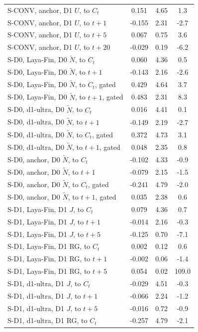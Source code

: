 \begin{longtable}{@{}lS[table-format=-1.3]S[table-format=1.2]S[table-format=-3.1]@{}}
S-CONV, anchor, D1 $U$, to $C_t$ & 0.151 & 4.65 & 1.3 \\
S-CONV, anchor, D1 $U$, to $t{+}1$ & -0.155 & 2.31 & -2.7 \\
S-CONV, anchor, D1 $U$, to $t{+}5$ & 0.067 & 0.75 & 3.6 \\
S-CONV, anchor, D1 $U$, to $t{+}20$ & -0.029 & 0.19 & -6.2 \\
S-D0, Laya-Fin, D0 $\tilde N$, to $C_t$ & 0.060 & 4.36 & 0.5 \\
S-D0, Laya-Fin, D0 $\tilde N$, to $t{+}1$ & -0.143 & 2.16 & -2.6 \\
S-D0, Laya-Fin, D0 $\tilde N$, to $C_t$, gated & 0.429 & 4.64 & 3.7 \\
S-D0, Laya-Fin, D0 $\tilde N$, to $t{+}1$, gated & 0.483 & 2.31 & 8.3 \\
S-D0, d1-ultra, D0 $\tilde N$, to $C_t$ & 0.016 & 4.41 & 0.1 \\
S-D0, d1-ultra, D0 $\tilde N$, to $t{+}1$ & -0.149 & 2.19 & -2.7 \\
S-D0, d1-ultra, D0 $\tilde N$, to $C_t$, gated & 0.372 & 4.73 & 3.1 \\
S-D0, d1-ultra, D0 $\tilde N$, to $t{+}1$, gated & 0.048 & 2.35 & 0.8 \\
S-D0, anchor, D0 $\tilde N$, to $C_t$ & -0.102 & 4.33 & -0.9 \\
S-D0, anchor, D0 $\tilde N$, to $t{+}1$ & -0.079 & 2.15 & -1.5 \\
S-D0, anchor, D0 $\tilde N$, to $C_t$, gated & -0.241 & 4.79 & -2.0 \\
S-D0, anchor, D0 $\tilde N$, to $t{+}1$, gated & 0.035 & 2.38 & 0.6 \\
S-D1, Laya-Fin, D1 $J$, to $C_t$ & 0.079 & 4.36 & 0.7 \\
S-D1, Laya-Fin, D1 $J$, to $t{+}1$ & -0.014 & 2.16 & -0.3 \\
S-D1, Laya-Fin, D1 $J$, to $t{+}5$ & -0.125 & 0.70 & -7.1 \\
S-D1, Laya-Fin, D1 RG, to $C_t$ & 0.002 & 0.12 & 0.6 \\
S-D1, Laya-Fin, D1 RG, to $t{+}1$ & -0.002 & 0.06 & -1.4 \\
S-D1, Laya-Fin, D1 RG, to $t{+}5$ & 0.054 & 0.02 & 109.0 \\
S-D1, d1-ultra, D1 $J$, to $C_t$ & -0.029 & 4.51 & -0.3 \\
S-D1, d1-ultra, D1 $J$, to $t{+}1$ & -0.066 & 2.24 & -1.2 \\
S-D1, d1-ultra, D1 $J$, to $t{+}5$ & -0.016 & 0.72 & -0.9 \\
S-D1, d1-ultra, D1 RG, to $C_t$ & -0.257 & 4.79 & -2.1 \\

\end{longtable}
